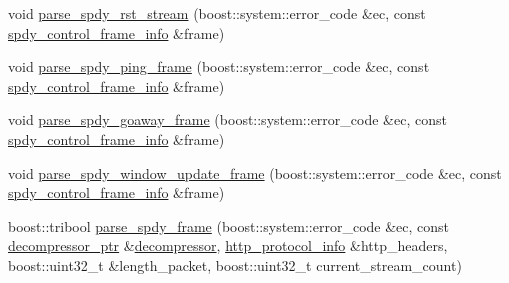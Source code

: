 \begin{DoxyCompactItemize}
void \hyperlink{classpion_1_1spdy_1_1parser_ad69dd18af5afc1b6d84d743c3d21d8e0}{parse\-\_\-spdy\-\_\-rst\-\_\-stream} (boost\-::system\-::error\-\_\-code \&ec, const \hyperlink{structpion_1_1spdy_1_1spdy__control__frame__info}{spdy\-\_\-control\-\_\-frame\-\_\-info} \&frame)
\item 
void \hyperlink{classpion_1_1spdy_1_1parser_a22199322320ed1a68407b438a898d98b}{parse\-\_\-spdy\-\_\-ping\-\_\-frame} (boost\-::system\-::error\-\_\-code \&ec, const \hyperlink{structpion_1_1spdy_1_1spdy__control__frame__info}{spdy\-\_\-control\-\_\-frame\-\_\-info} \&frame)
\item 
void \hyperlink{classpion_1_1spdy_1_1parser_ae213965a7a77b4cfb385bfa8685c3e50}{parse\-\_\-spdy\-\_\-goaway\-\_\-frame} (boost\-::system\-::error\-\_\-code \&ec, const \hyperlink{structpion_1_1spdy_1_1spdy__control__frame__info}{spdy\-\_\-control\-\_\-frame\-\_\-info} \&frame)
\item 
void \hyperlink{classpion_1_1spdy_1_1parser_a0ce476c60751c29909aec2af32b5b64e}{parse\-\_\-spdy\-\_\-window\-\_\-update\-\_\-frame} (boost\-::system\-::error\-\_\-code \&ec, const \hyperlink{structpion_1_1spdy_1_1spdy__control__frame__info}{spdy\-\_\-control\-\_\-frame\-\_\-info} \&frame)
\item 
boost\-::tribool \hyperlink{classpion_1_1spdy_1_1parser_af5bfc1663a565340d316b98fbf906b9b}{parse\-\_\-spdy\-\_\-frame} (boost\-::system\-::error\-\_\-code \&ec, const \hyperlink{namespacepion_1_1spdy_ac8512dffc9267ba133bd2c560f07fd1e}{decompressor\-\_\-ptr} \&\hyperlink{classpion_1_1spdy_1_1decompressor}{decompressor}, \hyperlink{namespacepion_1_1spdy_a5263e12cb89d30893e41f7b595cae89a}{http\-\_\-protocol\-\_\-info} \&http\-\_\-headers, boost\-::uint32\-\_\-t \&length\-\_\-packet, boost\-::uint32\-\_\-t current\-\_\-stream\-\_\-count)
\end{DoxyCompactItemize}
